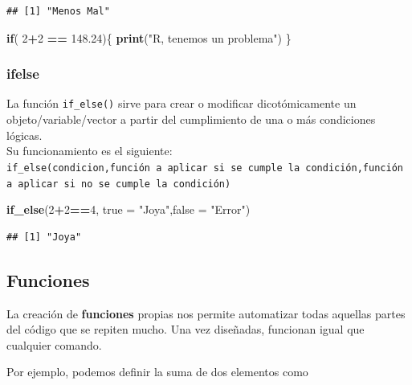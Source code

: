 \documentclass[]{book}
\newenvironment{Shaded}{\begin{snugshade}}{\end{snugshade}}
\newcommand{\ControlFlowTok}[1]{\textcolor[rgb]{0.13,0.29,0.53}{\textbf{#1}}}
\newcommand{\DataTypeTok}[1]{\textcolor[rgb]{0.13,0.29,0.53}{#1}}
\newcommand{\DecValTok}[1]{\textcolor[rgb]{0.00,0.00,0.81}{#1}}
\newcommand{\FloatTok}[1]{\textcolor[rgb]{0.00,0.00,0.81}{#1}}
\newcommand{\KeywordTok}[1]{\textcolor[rgb]{0.13,0.29,0.53}{\textbf{#1}}}
\newcommand{\NormalTok}[1]{#1}
\newcommand{\OperatorTok}[1]{\textcolor[rgb]{0.81,0.36,0.00}{\textbf{#1}}}
\newcommand{\StringTok}[1]{\textcolor[rgb]{0.31,0.60,0.02}{#1}}
\begin{document}
\begin{verbatim}
## [1] "Menos Mal"
\end{verbatim}

\begin{Shaded}
\begin{Highlighting}[]
\ControlFlowTok{if}\NormalTok{( }\DecValTok{2}\OperatorTok{+}\DecValTok{2} \OperatorTok{==}\StringTok{ }\FloatTok{148.24}\NormalTok{)\{}
  \KeywordTok{print}\NormalTok{(}\StringTok{"R, tenemos un problema"}\NormalTok{)}
\NormalTok{\}}
\end{Highlighting}
\end{Shaded}

\hypertarget{ifelse}{%
\subsubsection{ifelse}\label{ifelse}}

La función \texttt{if\_else()} sirve para crear o modificar dicotómicamente un objeto/variable/vector a partir del cumplimiento de una o más condiciones lógicas.\\
Su funcionamiento es el siguiente:\\
\texttt{if\_else(condicion,función\ a\ aplicar\ si\ se\ cumple\ la\ condición,función\ a\ aplicar\ si\ no\ se\ cumple\ la\ condición)}

\begin{Shaded}
\begin{Highlighting}[]
\KeywordTok{if_else}\NormalTok{(}\DecValTok{2}\OperatorTok{+}\DecValTok{2}\OperatorTok{==}\DecValTok{4}\NormalTok{, }\DataTypeTok{true =} \StringTok{"Joya"}\NormalTok{,}\DataTypeTok{false =} \StringTok{"Error"}\NormalTok{)}
\end{Highlighting}
\end{Shaded}

\begin{verbatim}
## [1] "Joya"
\end{verbatim}

\hypertarget{funciones-1}{%
\subsection{Funciones}\label{funciones-1}}

La creación de \textbf{funciones} propias nos permite automatizar todas aquellas partes del código que se repiten mucho. Una vez diseñadas, funcionan igual que cualquier comando.

Por ejemplo, podemos definir la suma de dos elementos como
\end{document}
